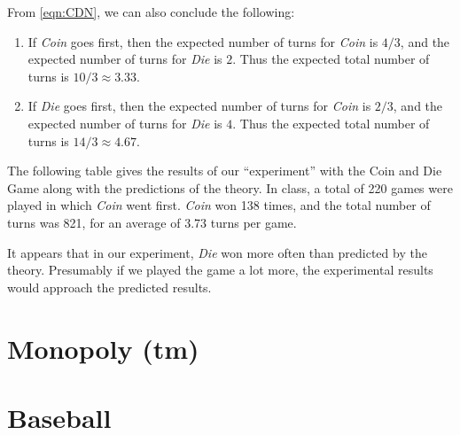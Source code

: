 \documentclass[reqno]{immbook}
\numberwithin{equation}{chapter}
\numberwithin{question}{section}
\numberwithin{theorem}{chapter}
\numberwithin{figure}{chapter}
\theoremstyle{definition}
\begin{document}
From \eqref{eqn:CDN}, we can also conclude the following:
\begin{enumerate}
\item If \emph{Coin} goes first, then the expected number of
turns for \emph{Coin} is $4/3$, and the expected number of
turns for \emph{Die} is $2$.  Thus the expected total number
of turns is $10/3\approx 3.33$.
\item If \emph{Die} goes first, then the expected number of
turns for \emph{Coin} is $2/3$, and the expected number of
turns for \emph{Die} is $4$.  Thus the expected total number
of turns is $14/3\approx 4.67$.
\end{enumerate}

The following table gives the results of our
``experiment'' with the Coin and Die Game along with
the predictions of the theory.
In class, a total of 220 games were played in which
\emph{Coin} went first.
\emph{Coin} won 138 times, and the total number of
turns was 821, for an average of 3.73 turns per game.

\medskip
\centerline{
}

\medskip
It appears that in our experiment, \emph{Die} won more
often than predicted by the theory.
Presumably if we played the game a lot more, the
experimental results would approach the predicted results.


\section{Monopoly (tm)}
\section{Baseball}
\end{document}
